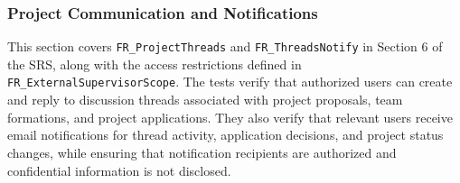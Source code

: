 \documentclass[12pt, titlepage]{article}
\begin{document}
\subsubsection{Project Communication and Notifications}

This section covers \texttt{FR\_ProjectThreads} and \texttt{FR\_ThreadsNotify} in Section 6 of the SRS, along with the access restrictions defined in \texttt{FR\_ExternalSupervisorScope}. The tests verify that authorized users can create and reply to discussion threads associated with project proposals, team formations, and project applications. They also verify that relevant users receive email notifications for thread activity, application decisions, and project status changes, while ensuring that notification recipients are authorized and confidential information is not disclosed.
\end{document}
